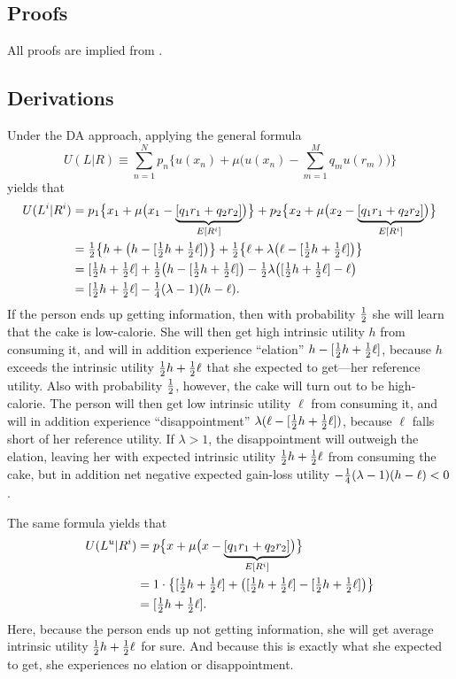 \subsection{Proofs}

All proofs are implied from \citet{koszegiReferenceDependentRiskAttitudes2007}.

\subsection{Derivations}

Under the DA approach, applying the general formula
\begin{equation*}
  U(L|R) \equiv \sum_{n=1}^N p_n\biggl\{u(x_n) + \mu\biggl(u(x_n) - \sum_{m=1}^M q_m
u(r_m)\biggr)\biggr\}
\end{equation*}
yields that
\begin{align*}
  U(L^i|R^i)
&= p_1\bigl\{x_1 + \mu\bigl(x_1 - \underbrace{[q_1r_1 + q_2r_2]}_{E[R^i]}\bigr)\bigr\}
 + p_2\bigl\{x_2 + \mu\bigl(x_2 - \underbrace{[q_1r_1 + q_2r_2]}_{E[R^i]}\bigr)\bigr\}
\\
&= \tfrac{1}{2}\bigl\{h + \bigl(h - [\tfrac{1}{2} h + \tfrac{1}{2}\ell]\bigr)\bigr\}
 + \tfrac{1}{2}\bigl\{\ell + \lambda\bigl(\ell - [\tfrac{1}{2} h + \tfrac{1}{2} \ell]\bigr)\bigr\}
\\
&= [\tfrac{1}{2} h + \tfrac{1}{2} \ell] + \tfrac{1}{2}\bigl(h - [\tfrac{1}{2} h + \tfrac{1}{2}\ell]\bigr)
   - \tfrac{1}{2}\lambda\bigl([\tfrac{1}{2} h + \tfrac{1}{2} \ell] - \ell\bigr)
\\
&= [\tfrac{1}{2} h + \tfrac{1}{2} \ell] - \tfrac{1}{4}(\lambda - 1)(h - \ell).
\end{align*}
If the person ends up getting information, then with probability $\tfrac{1}{2}$ she
will learn that the cake is low-calorie. She will then get high intrinsic
utility $h$ from consuming it, and will in addition experience ``elation'' $h
- [\tfrac{1}{2} h + \tfrac{1}{2}\ell]$, because $h$ exceeds the intrinsic utility $\tfrac{1}{2} h +
\tfrac{1}{2} \ell$ that she expected to get---her reference utility. Also with
probability $\tfrac{1}{2}$, however, the cake will turn out to be high-calorie. The
person will then get low intrinsic utility $\ell$ from consuming it, and will
in addition experience ``disappointment'' $\lambda(\ell - [\tfrac{1}{2} h +
\tfrac{1}{2}\ell])$, because $\ell$ falls short of her reference utility. If $\lambda
> 1$, the disappointment will outweigh the elation, leaving her with expected
intrinsic utility $\tfrac{1}{2} h + \tfrac{1}{2} \ell$ from consuming the cake, but in
addition net negative expected gain-loss utility $- \tfrac{1}{4}(\lambda - 1)(h -
\ell) < 0$.

The same formula yields that
\begin{align*}
  U(L^u|R^i)
&= p\bigl\{x + \mu\bigl(x - \underbrace{[q_1r_1 + q_2r_2]}_{E[R^i]}\bigr)\bigr\}
\\
&= 1\cdot\bigl\{[\tfrac{1}{2} h + \tfrac{1}{2} \ell] + \bigl([\tfrac{1}{2} h + \tfrac{1}{2} \ell] - [\tfrac{1}{2} h + \tfrac{1}{2} \ell]\bigr)\bigr\}\\
&= [\tfrac{1}{2} h + \tfrac{1}{2} \ell].
\end{align*}
Here, because the person ends up not getting information, she will get average
intrinsic utility $\tfrac{1}{2} h + \tfrac{1}{2} \ell$ for sure. And because this is exactly
what she expected to get, she experiences no elation or disappointment.

